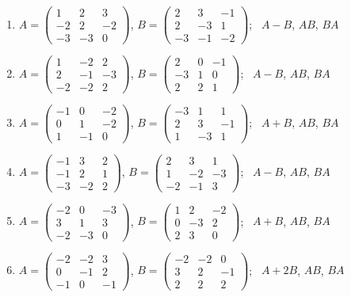 \begin{enumerate}[label=\arabic*., leftmargin=*]
\item $A=\begin{pmatrix}1 & 2 & 3\\ -2 & 2 & -2\\ -3 & -3 & 0\end{pmatrix}$, $B=\begin{pmatrix}2 & 3 & -1\\ 2 & -3 & 1\\ -3 & -1 & -2\end{pmatrix}$; \ $A-B$, $AB$, $BA$
\item $A=\begin{pmatrix}1 & -2 & 2\\ 2 & -1 & -3\\ -2 & -2 & 2\end{pmatrix}$, $B=\begin{pmatrix}2 & 0 & -1\\ -3 & 1 & 0\\ 2 & 2 & 1\end{pmatrix}$; \ $A-B$, $AB$, $BA$
\item $A=\begin{pmatrix}-1 & 0 & -2\\ 0 & 1 & -2\\ 1 & -1 & 0\end{pmatrix}$, $B=\begin{pmatrix}-3 & 1 & 1\\ 2 & 3 & -1\\ 1 & -3 & 1\end{pmatrix}$; \ $A+B$, $AB$, $BA$
\item $A=\begin{pmatrix}-1 & 3 & 2\\ -1 & 2 & 1\\ -3 & -2 & 2\end{pmatrix}$, $B=\begin{pmatrix}2 & 3 & 1\\ 1 & -2 & -3\\ -2 & -1 & 3\end{pmatrix}$; \ $A-B$, $AB$, $BA$
\item $A=\begin{pmatrix}-2 & 0 & -3\\ 3 & 1 & 3\\ -2 & -3 & 0\end{pmatrix}$, $B=\begin{pmatrix}1 & 2 & -2\\ 0 & -3 & 2\\ 2 & 3 & 0\end{pmatrix}$; \ $A+B$, $AB$, $BA$
\item $A=\begin{pmatrix}-2 & -2 & 3\\ 0 & -1 & 2\\ -1 & 0 & -1\end{pmatrix}$, $B=\begin{pmatrix}-2 & -2 & 0\\ 3 & 2 & -1\\ 2 & 2 & 2\end{pmatrix}$; \ $A+2B$, $AB$, $BA$
\end{enumerate}

